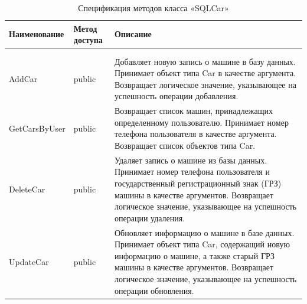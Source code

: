 \renewcommand{\arraystretch}{0.8} %
\begin{xltabular}{\textwidth}{|p{4cm}|p{3cm}|>{\setlength{\baselineskip}{0.7\baselineskip}}X|}
	\caption{Спецификация методов класса «SQLCar» \label{class6:table}}\\
	\hline \centrow \setlength{\baselineskip}{0.7\baselineskip} Наименование & \centrow \setlength{\baselineskip}{0.7\baselineskip} Метод доступа & \centrow Описание \\
	\hline {} &  & \\ \hline
	\endfirsthead
	 &  & \\ \hline
	\finishhead
	AddCar & public & Добавляет новую запись о машине в базу данных. Принимает объект типа Car в качестве аргумента. Возвращает логическое значение, указывающее на успешность операции добавления.\\ \hline 
	GetCarsByUser & public & Возвращает список машин, принадлежащих определенному пользователю. Принимает номер телефона пользователя в качестве аргумента. Возвращает список объектов типа Car.\\ \hline 
	DeleteCar & public & Удаляет запись о машине из базы данных. Принимает номер телефона пользователя и государственный регистрационный знак (ГРЗ) машины в качестве аргументов. Возвращает логическое значение, указывающее на успешность операции удаления.\\ \hline 
	UpdateCar & public & Обновляет информацию о машине в базе данных. Принимает объект типа Car, содержащий новую информацию о машине, а также старый ГРЗ машины в качестве аргументов. Возвращает логическое значение, указывающее на успешность операции обновления.\\ \hline 
\end{xltabular}
\renewcommand{\arraystretch}{1.0} %

